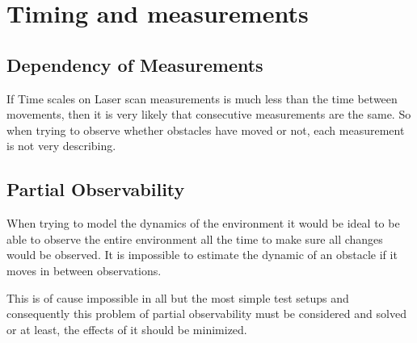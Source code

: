 \section{Timing and measurements}

\subsection{Dependency of Measurements}
If Time scales on Laser scan measurements is much less than the time between movements, then it is very likely that consecutive measurements are the same. 
So when trying to observe whether obstacles have moved or not, each measurement is not very describing.
\subsection{Partial Observability}
When trying to model the dynamics of the environment it would be ideal to be able to observe the entire environment all the time to make sure all changes would be observed. 
It is impossible to estimate the dynamic of an obstacle if it moves in between observations.

This is of cause impossible in all but the most simple test setups and consequently this problem of partial observability must be considered and solved or at least, the effects of it should be minimized.



